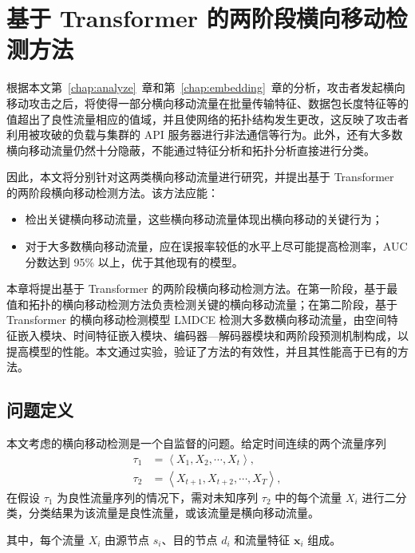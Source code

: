 \chapter{基于 Transformer 的两阶段横向移动检测方法}{
{
\let\cleardoublepage\relax
}

根据本文第~\ref{chap:analyze}~章和第~\ref{chap:embedding}~章的分析，攻击者发起横向移动攻击之后，将使得一部分横向移动流量在批量传输特征、数据包长度特征等的值超出了良性流量相应的值域，并且使网络的拓扑结构发生更改，这反映了攻击者利用被攻破的负载与集群的 API 服务器进行非法通信等行为。此外，还有大多数横向移动流量仍然十分隐蔽，不能通过特征分析和拓扑分析直接进行分类。

因此，本文将分别针对这两类横向移动流量进行研究，并提出基于 Transformer 的两阶段横向移动检测方法。该方法应能：

\begin{itemize}
    \item 检出关键横向移动流量，这些横向移动流量体现出横向移动的关键行为；
    \item 对于大多数横向移动流量，应在误报率较低的水平上尽可能提高检测率，AUC 分数达到 95\% 以上，优于其他现有的模型。
\end{itemize}

本章将提出基于 Transformer 的两阶段横向移动检测方法。在第一阶段，基于最值和拓扑的横向移动检测方法负责检测关键的横向移动流量；在第二阶段，基于 Transformer 的横向移动检测模型 LMDCE 检测大多数横向移动流量，由空间特征嵌入模块、时间特征嵌入模块、编码器—解码器模块和两阶段预测机制构成，以提高模型的性能。本文通过实验，验证了方法的有效性，并且其性能高于已有的方法。

\section{问题定义}

本文考虑的横向移动检测是一个自监督的问题。给定时间连续的两个流量序列
\begin{equation}
    \label{eq:definition}
    \begin{split}
        \tau_1 &= \left \langle X_1, X_2, \cdots, X_t \right \rangle ,\\
        \tau_2 &= \left \langle X_{t+1}, X_{t+2}, \cdots, X_T \right \rangle ,
    \end{split}
\end{equation}
在假设 $\tau_1$ 为良性流量序列的情况下，需对未知序列 $\tau_2$ 中的每个流量 $X_i$ 进行二分类，分类结果为该流量是良性流量，或该流量是横向移动流量。

其中，每个流量 $X_i$ 由源节点 $s_i$、目的节点 $d_i$ 和流量特征 $\mathbf{x}_i$ 组成。

}
